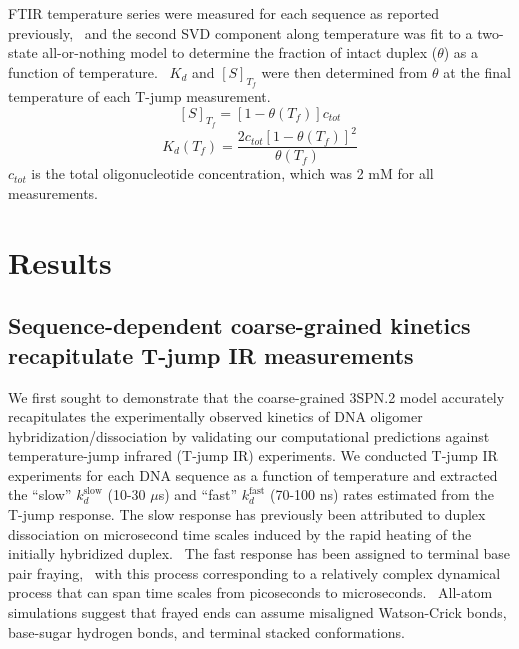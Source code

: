 \documentclass[journal=jpcbfk,manuscript=article]{achemso}
\begin{document}
FTIR temperature series were measured for each sequence as reported previously,~\citep{Sanstead2016} and the second SVD component along temperature was fit to a two-state all-or-nothing model to determine the fraction of intact duplex ($\theta$) as a function of temperature.~\citep{Marky1987CalculatingCurves} $K_d$ and $[S]_{T_f}$ were then determined from $\theta$ at the final temperature of each T-jump measurement. 
	\begin{equation}\label{e3a}
	[S]_{T_f} = [1 - \theta(T_f)]c_{tot}
	\end{equation}
	\begin{equation}\label{e3b}
	K_d(T_f) = \frac{2c_{tot}[1 - \theta(T_f)]^2}{\theta(T_f)}
	\end{equation}
$c_{tot}$ is the total oligonucleotide concentration, which was 2 mM for all measurements.



\section{\label{sec:Results}Results}

\subsection{Sequence-dependent coarse-grained kinetics recapitulate T-jump IR measurements} \label{sec:time}


We first sought to demonstrate that the coarse-grained 3SPN.2 model accurately recapitulates the experimentally observed kinetics of DNA oligomer hybridization/dissociation by validating our computational predictions against temperature-jump infrared (T-jump IR) experiments. We conducted T-jump IR experiments for each DNA sequence as a function of temperature and extracted the ``slow'' $k_d^\mathrm{slow}$ (10-30 $\mu$s) and ``fast'' $k_d^\mathrm{fast}$ (70-100 ns) rates estimated from the T-jump response. The slow response has previously been attributed to duplex dissociation on microsecond time scales induced by the rapid heating of the initially hybridized duplex.~\citep{Sanstead2016, Sanstead2018DirectDehybridization} The fast response has been assigned to terminal base pair fraying,~\citep{Sanstead2016, Sanstead2018DirectDehybridization} with this process corresponding to a relatively complex dynamical process that can span time scales from picoseconds to microseconds.~\cite{Nonin1995TerminalFraying, Nikolova2012ProbingSimulations, Andreatta2006UltrafastHelix, Galindo-Murillo2015ConvergenceDGCACGAACGAACGAACGC} All-atom simulations suggest that frayed ends can assume misaligned Watson-Crick bonds, base-sugar hydrogen bonds, and terminal stacked conformations.~\citep{PinamontiTheModels, Zgarbova2014BaseRNA} 
\end{document}

